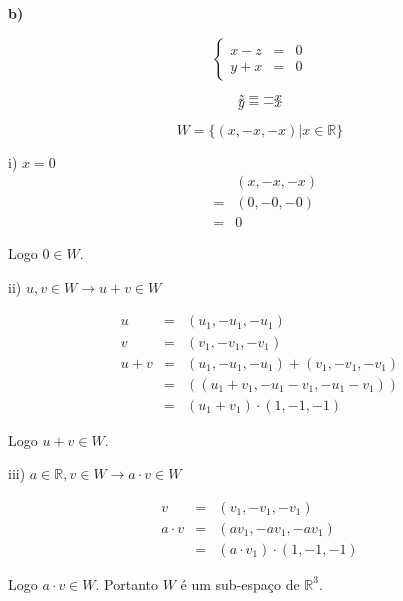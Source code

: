 \documentclass[11pt]{article}
\newenvironment{question}[1]
  {\par\addvspace{\medskipamount}
   \noindent\makebox[0pt][r]{\textbf{#1)} }\ignorespaces}
  {\par\addvspace{\medskipamount}}
\begin{document}
\begin{question}{3}

\textbf{b)}

$$
\left\{\begin{array}{rcl}
  x-z &= &0\\
  y+x &= &0
\end{array}\right.
$$

$$z = -x$$
$$y = -x$$
    
$$W = \{(x,-x,-x)|x \in \mathbb{R}\}$$

i) $x = 0$
$$
\begin{array}{rcl}
    &  &(x,-x,-x)\\
    &= &(0,-0,-0)\\
    &= &0
\end{array}
$$

Logo $0 \in W$.

\bigskip
ii) $u,v \in W \rightarrow u+v \in W$

$$
\begin{array}{rcl}
    u &= &(u_1,-u_1,-u_1)\\
    v &= &(v_1,-v_1,-v_1)\\
    u + v &= &(u_1,-u_1,-u_1) + (v_1,-v_1,-v_1)\\
          &= &((u_1+v_1,-u_1-v_1,-u_1-v_1))\\
          &= &(u_1+v_1) \cdot (1,-1,-1)
\end{array}
$$

Logo $u + v \in W$.

\bigskip
iii) $a \in \mathbb{R}, v \in W \rightarrow a \cdot v \in W$

$$
\begin{array}{rcl}
    v &= &(v_1,-v_1,-v_1)\\
    a \cdot v &= &(a v_1,-a v_1,-a v_1)\\
          &= &(a \cdot v_1) \cdot (1,-1,-1)
\end{array}
$$

Logo $a \cdot v \in W$. Portanto $W$ é um sub-espaço de $\mathbb{R}^3$.

\end{question}
\end{document}

